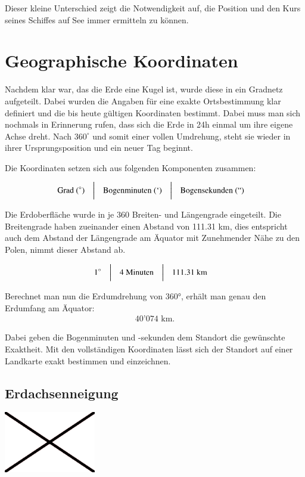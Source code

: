 \begin{refsection}
Dieser kleine Unterschied zeigt die Notwendigkeit auf, die Position und den Kurs seines Schiffes auf See immer ermitteln zu können.


\section{Geographische Koordinaten}

Nachdem klar war, das die Erde eine Kugel ist, wurde diese in ein Gradnetz aufgeteilt. Dabei wurden die Angaben für eine exakte Ortsbestimmung klar definiert und die bis heute gültigen Koordinaten bestimmt.
Dabei muss man sich nochmals in Erinnerung rufen, dass sich die Erde in 24h einmal um ihre eigene Achse dreht. Nach $360 ^{\circ}$ 
und somit einer vollen Umdrehung, steht sie wieder in ihrer Ursprungsposition und ein neuer Tag beginnt.

Die Koordinaten setzen sich aus folgenden Komponenten zusammen:

\[
\begin{aligned}
&\text{Grad } (^{\circ})
&
&\text{\bigg \vert}
&
&\text{Bogenminuten } (`)
&
&\text{\bigg \vert}
&
&\text{Bogensekunden } (``)
\end{aligned}
\]

Die Erdoberfläche wurde in je 360 Breiten- und Längengrade eingeteilt. Die Breitengrade haben zueinander einen Abstand von 111.31 km, dies entspricht auch dem Abstand der Längengrade am Äquator mit Zunehmender Nähe zu den Polen, nimmt dieser Abstand ab.

\[
\begin{aligned}
&1^{\circ}
&
&\text{\bigg \vert}
&
&4 \text{ Minuten}
&
&\text{\bigg \vert}
&
&111.31\text{ km}
\end{aligned}
\]

Berechnet man nun die Erdumdrehung von 360°, erhält man genau den Erdumfang am Äquator: \begin{align*} 40’074 \text{ km.}\end{align*}

Dabei geben die Bogenminuten und -sekunden dem Standort die gewünschte Exaktheit. Mit den vollständigen Koordinaten lässt sich der Standort auf einer Landkarte exakt bestimmen und einzeichnen.

\subsection{Erdachsenneigung}

\begin{center}
        \includegraphics[width=0.3\textwidth]{kugel/Beispielbild.jpg}
\end{center}


\end{refsection}
